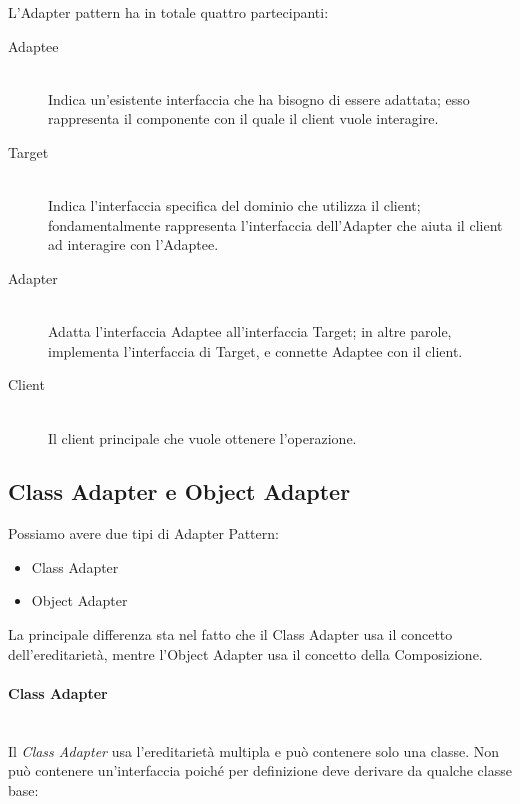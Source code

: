    L'Adapter pattern ha in totale quattro partecipanti:
    \begin{description}
      \item[Adaptee] \hfill \\
      Indica un’esistente interfaccia che ha bisogno di essere adattata; 
      esso rappresenta il componente con il quale il client vuole interagire.
      
      \item[Target] \hfill \\
      Indica l’interfaccia specifica del dominio che utilizza il client; 
      fondamentalmente rappresenta l’interfaccia dell’Adapter che aiuta il 
      client ad interagire con l’Adaptee.

      \item[Adapter] \hfill \\
      Adatta l’interfaccia Adaptee all’interfaccia Target; 
      in altre parole, implementa l’interfaccia di Target, e connette 
      Adaptee con il client.

      \item[Client] \hfill \\
      Il client principale che vuole ottenere l’operazione.
      
    \end{description}
    
    \subsection{Class Adapter e Object Adapter} \hfill
    
    Possiamo avere due tipi di Adapter Pattern:
    \begin{itemize}
      \item Class Adapter
      \item Object Adapter
    \end{itemize}
    
    La principale differenza sta nel fatto che il Class Adapter usa il 
    concetto dell’ereditarietà, mentre l’Object Adapter usa il concetto 
    della Composizione.
  
    \paragraph{Class Adapter} \hfill \\
    Il \emph{Class Adapter} usa l’ereditarietà multipla e può contenere 
    solo una classe. Non può contenere un’interfaccia poiché per 
    definizione deve derivare da qualche classe base:
    
